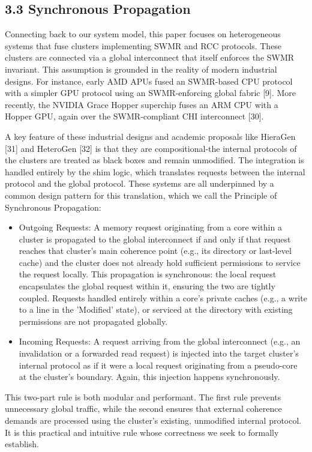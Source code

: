 \documentclass[10pt]{article}
\begin{document}
\subsection*{3.3 Synchronous Propagation}
Connecting back to our system model, this paper focuses on heterogeneous systems that fuse clusters implementing SWMR and RCC protocols. These clusters are connected via a global interconnect that itself enforces the SWMR invariant. This assumption is grounded in the reality of modern industrial designs. For instance, early AMD APUs fused an SWMR-based CPU protocol with a simpler GPU protocol using an SWMR-enforcing global fabric [9]. More recently, the NVIDIA Grace Hopper superchip fuses an ARM CPU with a Hopper GPU, again over the SWMR-compliant CHI interconnect [30].

A key feature of these industrial designs and academic proposals like HieraGen [31] and HeteroGen [32] is that they are compositional-the internal protocols of the clusters are treated as black boxes and remain unmodified. The integration is handled entirely by the shim logic, which translates requests between the internal protocol and the global protocol. These systems are all underpinned by a common design pattern for this translation, which we call the Principle of Synchronous Propagation:

\begin{itemize}
  \item[-] Outgoing Requests: A memory request originating from a core within a cluster is propagated to the global interconnect if and only if that request reaches that cluster's main coherence point (e.g., its directory or last-level cache) and the cluster does not already hold sufficient permissions to service the request locally. This propagation is synchronous: the local request encapsulates the global request within it, ensuring the two are tightly coupled. Requests handled entirely within a core's private caches (e.g., a write to a line in the 'Modified' state), or serviced at the directory with existing permissions are not propagated globally.
  \item[-] Incoming Requests: A request arriving from the global interconnect (e.g., an invalidation or a forwarded read request) is injected into the target cluster's internal protocol as if it were a local request originating from a pseudo-core at the cluster's boundary. Again, this injection happens synchronously.
\end{itemize}

This two-part rule is both modular and performant. The first rule prevents unnecessary global traffic, while the second ensures that external coherence demands are processed using the cluster's existing, unmodified internal protocol. It is this practical and intuitive rule whose correctness we seek to formally establish.
\end{document}
